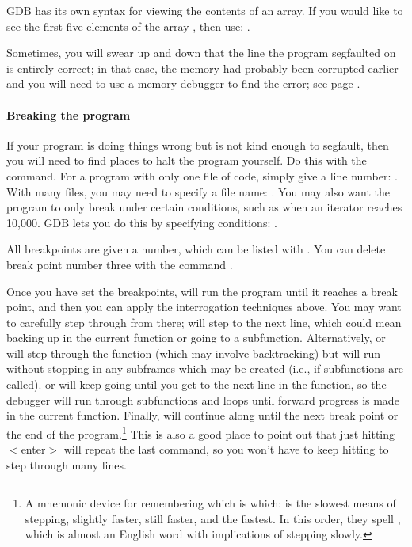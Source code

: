 GDB has its own syntax for viewing the contents of an array. If you
would like to see the first five elements of the array ,
then use: .

Sometimes, you will swear up and down that the line the program segfaulted on is
entirely correct; in that case, the memory had probably been corrupted
earlier and you will need to use a memory debugger to find the error;
see page \pageref{valgrind}.

\paragraph{Breaking the program} If your program is doing things wrong but is not kind
enough to segfault, then you will need to find places to halt the program
yourself. Do this with the  command. For a program with only
one file of code, simply give a line number: . With many
files, you may need to specify a file name: . You
may also want the program to only break under certain conditions, such
as when an iterator reaches 10,000. GDB lets you do this by specifying
conditions: .

All breakpoints are given a number, which can be listed with
. You can delete break point number three with
the command .

Once you have set the breakpoints,  will run the program until it
reaches a break point, and then you can apply the interrogation techniques
above. You may want to carefully step through from there; 
will step to the next line, which could mean backing up in the current
function or going to a subfunction. Alternatively,  or 
 will step through the function (which may involve backtracking) but
will run without stopping in any subframes which may be created
(i.e., if subfunctions are called).   or  will keep
going until you get to the next line in the function, so the debugger
will run through subfunctions and loops until forward progress is made
in the current function.  Finally,  will continue along until the next
break point or the end of the program.\footnote{A mnemonic device for
remembering which is which:  is the slowest means of stepping,
 slightly faster,  still faster, and  the fastest. In
this order, they spell , which is almost an English word
with implications of stepping slowly.} This is also a good place to
point out that just hitting $<$enter$>$ will repeat the last command,
so you won't have to keep hitting  to step through many lines.

